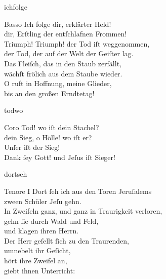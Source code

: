 \documentclass[tocstyle=ref-genre]{ees}
\begin{document}
{\begin{movement}{ichfolge}
  \item[Basso]
  Ich folge dir, erklärter Held!\\
  dir, Erſtling der entſchlafnen Frommen!\\
  Triumph! Triumph! der Tod iſt weggenommen,\\
  der Tod, der auf der Welt der Geiſter lag.\\
  Das Fleiſch, das in den Staub zerfällt,\\
  wächſt frölich aus dem Staube wieder.\\
  O ruft in Hoffnung, meine Glieder,\\
  bis an den großen Erndtetag!
\end{movement}

\begin{movement}{todwo}
  \item[Coro]
  Tod! wo iſt dein Stachel?\\
  dein Sieg, o Hölle! wo iſt er?\\
  Unſer iſt der Sieg!\\
  Dank ſey Gott! und Jeſus iſt Sieger!
\end{movement}

\begin{movement}{dortseh}
  \item[Tenore I]
  Dort ſeh ich aus den Toren Jeruſalems\\
  zween Schüler Jeſu gehn.\\
  In Zweifeln ganz, und ganz in Traurigkeit verloren,\\
  gehn ſie durch Wald und Feld,\\
  und klagen ihren Herrn.\\
  Der Herr geſellt ſich zu den Traurenden,\\
  umnebelt ihr Geſicht,\\
  hört ihre Zweifel an,\\
  giebt ihnen Unterricht:


\end{movement}}
\end{document}
